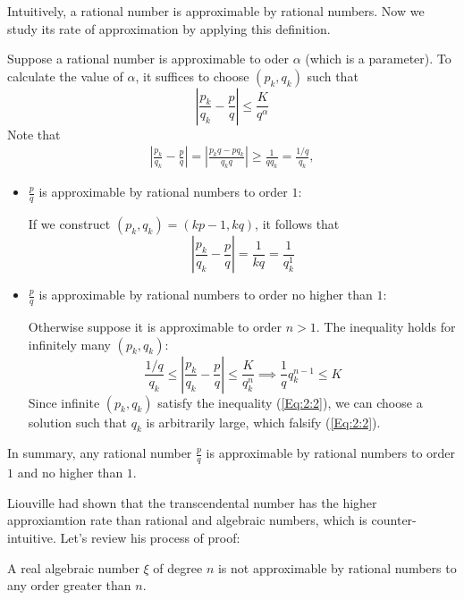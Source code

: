 Intuitively, a rational number is approximable by rational numbers. Now we study its rate of approximation by applying this definition.
\begin{example}
Suppose a rational number is approximable to oder $\alpha$ (which is a parameter). To calculate the value of $\alpha$, it suffices to choose $(p_k,q_k)$ such that
\[
\left|
\frac{p_k}{q_k}-\frac{p}{q}
\right|\le\frac{K}{q^\alpha}
\]
Note that
\begin{align*}
\left|
\frac{p_k}{q_k}-\frac{p}{q}
\right|=\left|
\frac{p_kq-pq_k}{q_kq}
\right|\ge\frac{1}{qq_k}=\frac{1/q}{q_k},
\end{align*}
\begin{itemize}
\item
$\frac{p}{q}$ is approximable by rational numbers to order $1$:

If we construct $(p_k,q_k)=(kp-1,kq)$, it follows that
\[
\left|
\frac{p_k}{q_k}-\frac{p}{q}
\right|=\frac{1}{kq}=\frac{1}{q_k^1}
\]
\item
$\frac{p}{q}$ is approximable by rational numbers to order no higher than $1$:

Otherwise suppose it is approximable to order $n>1$. The inequality holds for infinitely many $(p_k,q_k)$:
\begin{equation}
\frac{1/q}{q_k}\le\left|
\frac{p_k}{q_k}-\frac{p}{q}
\right|\le\frac{K}{q^n_k}\implies
\frac{1}{q}q_k^{n-1}\le K\label{Eq:2:2}
\end{equation}
Since infinite $(p_k,q_k)$ satisfy the inequality (\ref{Eq:2:2}), we can choose a solution such that $q_k$ is arbitrarily large, which falsify (\ref{Eq:2:2}).
\end{itemize}
In summary, any rational number $\frac{p}{q}$ is approximable by rational numbers to order $1$ and no higher than $1$. 
\end{example}

Liouville had shown that the transcendental number has the higher approxiamtion rate than rational and algebraic numbers, which is counter-intuitive. Let's review his process of proof:

\begin{theorem}[Liouville, 1844]
A real algebraic number $\xi$ of degree $n$ is not approximable by rational numbers to any order greater than $n$.
\end{theorem}

